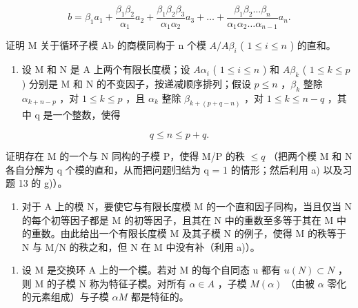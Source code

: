 \[
b = \beta_ {1} a _ {1} + \frac {\beta_ {1} \beta_ {2}}{\alpha_ {1}} a _ {2} + \frac {\beta_ {1} \beta_ {2} \beta_ {3}}{\alpha_ {1} \alpha_ {2}} a _ {3} + \dots + \frac {\beta_ {1} \beta_ {2} \dots \beta_ {n}}{\alpha_ {1} \alpha_ {2} \dots \alpha_ {n - 1}} a _ {n}.
\]

证明 M 关于循环子模 Ab 的商模同构于 n 个模 \(A/A\beta_{i}\) ( \(1 \leq i \leq n\) ) 的直和。

\begin{enumerate}
\def\labelenumi{\alph{enumi})}
\setcounter{enumi}{1}
\tightlist
\item
  设 M 和 N 是 A 上两个有限长度模；设 \(A\alpha_{i}\) ( \(1 \leqslant i \leqslant n\) ) 和 \(A\beta_{k}\) ( \(1 \leqslant k \leqslant p\) ) 分别是 M 和 N 的不变因子，按递减顺序排列；假设 \(p \leqslant n\) ，\(\beta_{k}\) 整除 \(\alpha_{k+n-p}\) ，对 \(1 \leqslant k \leqslant p\) ，且 \(\alpha_{k}\) 整除 \(\beta_{k+(p+q-n)}\) ，对 \(1 \leqslant k \leqslant n-q\) ，其中 q 是一个整数，使得
\end{enumerate}

\[
q \leqslant n \leqslant p + q.
\]

证明存在 M 的一个与 N 同构的子模 P，使得 M/P 的秩 \(\leq q\) （把两个模 M 和 N 各自分解为 q 个模的直和，从而把问题归结为 q = 1 的情形；然后利用 a) 以及习题 13 的 g)）。

\begin{enumerate}
\def\labelenumi{\alph{enumi})}
\setcounter{enumi}{2}
\tightlist
\item
  对于 A 上的模 N，要使它与有限长度模 M 的一个直和因子同构，当且仅当 N 的每个初等因子都是 M 的初等因子，且其在 N 中的重数至多等于其在 M 中的重数。由此给出一个有限长度模 M 及其子模 N 的例子，使得 M 的秩等于 N 与 M/N 的秩之和，但 N 在 M 中没有补（利用 a)）。
\end{enumerate}

\begin{enumerate}
\def\labelenumi{\arabic{enumi})}
\setcounter{enumi}{15}
\tightlist
\item
  设 M 是交换环 A 上的一个模。若对 M 的每个自同态 u 都有 \(u(N) \subset N\) ，则 M 的子模 N 称为特征子模。对所有 \(\alpha \in A\) ，子模 \(M(\alpha)\) （由被 \(\alpha\) 零化的元素组成）与子模 \(\alpha M\) 都是特征的。
\end{enumerate}

